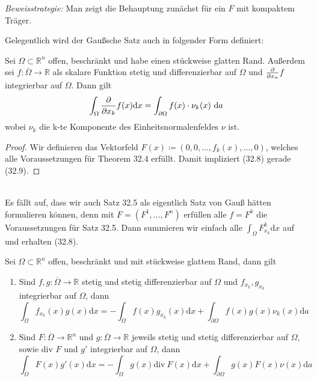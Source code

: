 \emph{Beweisstrategie:} Man zeigt die Behauptung zunächst 
für ein $F$ mit kompaktem Träger.\\
\linebreak

Gelegentlich wird der Gaußsche Satz auch in folgender Form definiert:

\begin{satz}
Sei $\Omega\subset\mathbb{R}^n$ offen, beschränkt und habe 
einen stückweise glatten Rand. Außerdem sei $f:\overline{\Omega}\rightarrow\mathbb{R}$ als skalare 
Funktion stetig und differenzierbar auf $\Omega$ und 
$\frac{\partial{}}{\partial{x_n}}f$ integrierbar auf $\Omega$. 
Dann gilt
\begin{equation}
	\int_\Omega\frac{\partial{}}{\partial{x_k}}f(x)\mathrm{d}x = 
	\int_{\partial\Omega}f(x)\cdot\nu_k(x)\ \mathrm{d}a
\end{equation}
wobei $\nu_k$ die k-te Komponente des Einheitsnormalenfeldes 
$\nu$ ist.
\end{satz}

\begin{proof}
Wir definieren das Vektorfeld $F(x)\coloneqq 
(0,0,. . .,f_k(x),. . .,0)$, welches alle Voraussetzungen 
für Theorem 32.4 erfüllt. Damit impliziert (32.8) gerade 
(32.9).
\end{proof}
\ \\
Es fällt auf, dass wir auch Satz 32.5 als eigentlich Satz 
von Gauß hätten formulieren können, denn mit $F = 
(F^1,...,F^n)$ erfüllen alle $f=F^k$ die Voraussetzungen 
für Satz 32.5. Dann summieren wir einfach alle $\int_\Omega F_{x_k}^k\mathrm{d}x$ auf und erhalten (32.8).

\begin{theorem}
Sei $\Omega\subset\mathbb{R}^n$ offen, beschränkt und mit 
stückweise glattem Rand, dann gilt
\begin{enumerate}
	\item 	Sind $f,g:\overline{\Omega}\rightarrow\mathbb{R}$ 
			stetig und stetig differenzierbar auf 
			$\Omega$ und $f_{x_k},g_{x_k}$ integrierbar auf 
			$\Omega$, dann 
			\begin{equation}
				\int_\Omega f_{x_k}(x)g(x)\mathrm{d}x = 
				- \int_\Omega f(x)g_{x_k}(x)\mathrm{d}x + 
				\int_{\partial\Omega}f(x)g(x)\nu_k(x)\mathrm{d}a
			\end{equation}
	\item Sind $F:\overline{\Omega}\rightarrow\mathbb{R}^n$ 
			und $g:\overline{\Omega}\rightarrow\mathbb{R}$ 
			jeweils stetig und stetig differenzierbar auf 
			$\Omega$, sowie div $F$ und $g'$ integrierbar 
			auf $\Omega$, dann
			\begin{equation}
				\int_\Omega F(x)g'(x)\mathrm{d}x = 
				-\int_\Omega g(x)\mathrm{div\ }F(x)\mathrm{d}x + 
				\int_{\partial\Omega}g(x)F(x)\nu(x)\mathrm{d}a
			\end{equation}
\end{enumerate}
\end{theorem}

